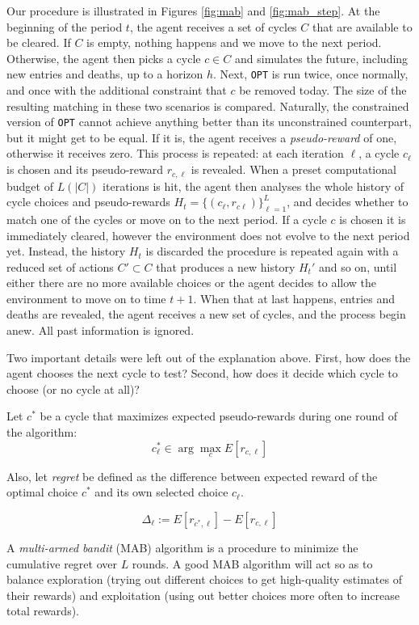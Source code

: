 \documentclass[format=acmsmall, review=false]{acmart}
\begin{document}
Our procedure is illustrated in Figures \ref{fig:mab} and \ref{fig:mab_step}. At the beginning of the period $t$, the agent receives a set of cycles $C$ that are available to be cleared. If $C$ is empty, nothing happens and we move to the next period. Otherwise, the agent then picks a cycle $c \in C$ and simulates the future, including new entries and deaths, up to a horizon $h$. Next, \texttt{OPT} is run twice, once normally, and once with the additional constraint that $c$ be removed today. The size of the resulting matching in these two scenarios is compared. Naturally, the constrained version of \texttt{OPT} cannot achieve anything better than its unconstrained counterpart, but it might get to be equal. If it is, the agent receives a \emph{pseudo-reward} of one, otherwise it receives zero. This process is repeated: at each iteration $\ell$, a cycle $c_{\ell}$ is chosen and its pseudo-reward $r_{c, \ell}$ is revealed. When a preset computational budget of $L(|C|)$ iterations is hit, the agent then analyses the whole history of cycle choices and pseudo-rewards $H_{t} = \{ (c_{\ell}, r_{c\ell} ) \}_{\ell=1}^{L}$, and decides whether to match one of the cycles or move on to the next period. If a cycle $c$ is chosen it is immediately cleared, however the environment does not evolve to the next period yet. Instead, the history $H_t$ is discarded the procedure is repeated again with a reduced set of actions $C' \subset C$ that produces a new history $H_t'$ and so on, until either there are no more available choices or the agent decides to allow the environment to move on to time $t+1$. When that at last happens, entries and deaths are revealed, the agent receives a new set of cycles, and the process begin anew. All past information is ignored.


Two important details were left out of the explanation above. First, how does the agent chooses the next cycle to test? Second, how does it decide which cycle to choose (or no cycle at all)? 

Let $c^{*}$ be a cycle that maximizes expected pseudo-rewards during one round of the algorithm:
$$c_{\ell}^{*} \in \arg\max_{c} E[r_{c,\ell}] $$


 Also, let \emph{regret} be defined as the difference between expected reward of the optimal choice $c^*$ and its own selected choice $c_{\ell}$.
 
 $$\Delta_\ell := E[r_{c^{*},\ell}] - E[r_{c,\ell}]$$
 
 A \emph{multi-armed bandit} (MAB) algorithm is a procedure to minimize the cumulative regret over $L$ rounds. A good MAB algorithm will act so as to balance exploration (trying out different choices to get high-quality estimates of their rewards) and exploitation (using out better choices more often to increase total rewards). 
 
\end{document}
